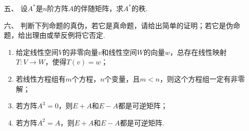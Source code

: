 \begin{enumerate}
	\item[五、]设$A^*$是$n$阶方阵$A$的伴随矩阵，求$A^*$的秩.
	\item[六、]判断下列命题的真伪，若它是真命题，请给出简单的证明；若它是伪命题，给出理由或举反例将它否定.
	\begin{enumerate}[label=(\arabic*)]
        \item 给定线性空间$V$的非零向量$v$和线性空间$W$的向量$w$，总存在线性映射$T:V\to W$，使得$T(v)=w$；
        \item 若线性方程组有$m$个方程，$n$个变量，且$m<n$，则这个方程组一定有非零解；
        \item 若方阵$A^3=0$，则$E+A$和$E-A$都是可逆矩阵；
        \item 若方阵$A^2=A$，则$E+A$和$E-A$都是可逆矩阵.
    \end{enumerate}
\end{enumerate}

\clearpage

